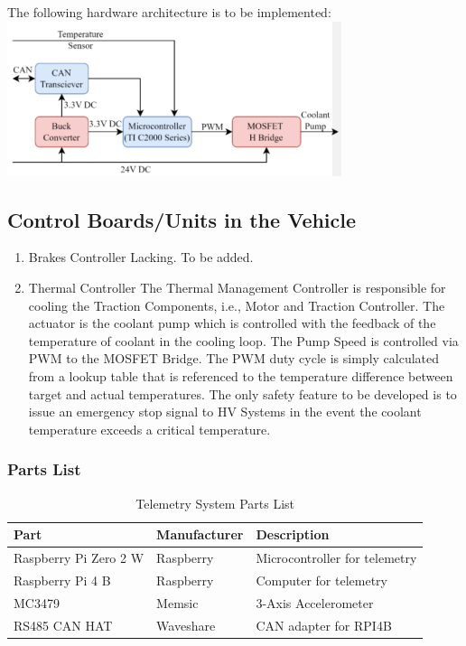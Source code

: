 The following hardware architecture is to be implemented:
\includegraphics[width=\textwidth]{texfiles/elec/eimg/Thermal_architecture}

\subsection{Control Boards/Units in the Vehicle}

\begin{enumerate}
    \item Brakes Controller
    Lacking. To be added.

    \item Thermal Controller
The Thermal Management Controller is responsible for cooling the Traction Components, i.e., Motor and Traction Controller. The actuator is the coolant pump which is controlled  with the feedback of the temperature of coolant in the cooling loop.  The Pump Speed is controlled via PWM to the MOSFET Bridge. The PWM duty cycle is simply calculated from a lookup table that is referenced to the temperature difference between target and actual temperatures. The only safety feature to be developed is to issue an emergency stop signal to HV Systems in the event the coolant temperature exceeds a critical
temperature.

\end{enumerate}

\subsubsection{Parts List}

\begin{table}[H]
\centering
\begin{tabular}{|l|l|l|}
\hline
\textbf{Part} & \textbf{Manufacturer} & \textbf{Description} \\ \hline
Raspberry Pi Zero 2 W & Raspberry & Microcontroller for telemetry \\ \hline
Raspberry Pi 4 B & Raspberry & Computer for telemetry \\ \hline
MC3479 & Memsic & 3-Axis Accelerometer \\ \hline
RS485 CAN HAT & Waveshare & CAN adapter for RPI4B \\ \hline
\end{tabular}
\caption{Telemetry System Parts List}
\label{tab:my-table}
\end{table}



